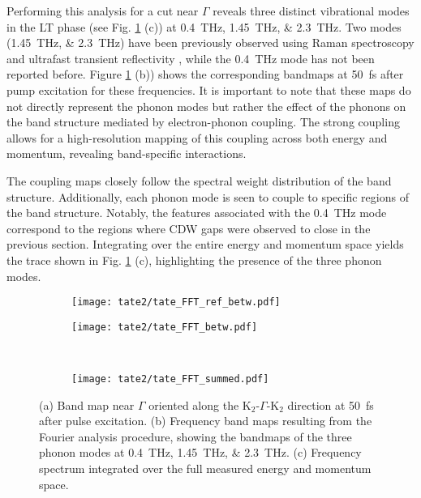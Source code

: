 Performing this analysis for a cut near $\Gamma$ reveals three distinct vibrational modes in the LT phase (see Fig. \ref{fig:TaTe_FFT_betw} (c)) at \qtylist{0.4; 1.45; 2.3}{\tera\hertz}.
Two modes (\qtylist{1.45; 2.3}{\tera\hertz}) have been previously observed using Raman spectroscopy and ultrafast transient reflectivity \cite{luo_subtle_2021, hu_optical_2022}, while the \qty{0.4}{\tera\hertz} mode has not been reported before.
Figure \ref{fig:TaTe_FFT_betw} (b)) shows the corresponding bandmaps at \qty{50}{\femto\second} after pump excitation for these frequencies.
It is important to note that these maps do not directly represent the phonon modes but rather the effect of the phonons on the band structure mediated by electron-phonon coupling.
The strong coupling allows for a high-resolution mapping of this coupling across both energy and momentum, revealing band-specific interactions.

The coupling maps closely follow the spectral weight distribution of the band structure.
Additionally, each phonon mode is seen to couple to specific regions of the band structure.
Notably, the features associated with the \qty{0.4}{\tera\hertz} mode correspond to the regions where CDW gaps were observed to close in the previous section.
Integrating over the entire energy and momentum space yields the trace shown in Fig. \ref{fig:TaTe_FFT_betw} (c), highlighting the presence of the three phonon modes.

\begin{figure}[t]
	\centering
	\begin{subfigure}[b]{0.24\textwidth}
		\texttt{[image: tate2/tate\_FFT\_ref\_betw.pdf]}
		\caption{}
	\end{subfigure}
	\begin{subfigure}[b]{0.72\textwidth}
		\texttt{[image: tate2/tate\_FFT\_betw.pdf]}
		\caption{}
	\end{subfigure}
	\\
	\begin{subfigure}[b]{0.33\textwidth}
		\texttt{[image: tate2/tate\_FFT\_summed.pdf]}
		\caption{}
	\end{subfigure}
	\caption{(a) Band map near $\Gamma$ oriented along the K$_2$-$\Gamma$-K$_2$ direction at \qty{50}{\femto\second} after pulse excitation. (b) Frequency band maps resulting from the Fourier analysis procedure, showing the bandmaps of the three phonon modes at \qtylist{0.4;1.45;2.3}{\tera\hertz}. (c) Frequency spectrum integrated over the full measured energy and momentum space.}
	\label{fig:TaTe_FFT_betw}
\end{figure}

